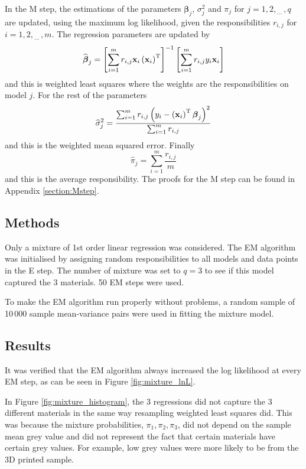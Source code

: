\documentclass[12pt]{report}
\newcommand{\T}{^\textup{T}}
\newcommand{\dotdotdot}{_{\phantom{.}\cdots}}
\newcommand{\vect}[1]{\mathbf{#1}}
\newcommand{\vectGreek}[1]{\boldsymbol{#1}}
\begin{document}
In the M step, the estimations of the  parameters $\vectGreek{\beta}_j$, $\sigma_j^2$ and $\pi_j$ for $j=1,2,\dotdotdot,q$ are updated, using the maximum log likelihood, given the responsibilities $r_{i,j}$ for $i=1,2,\dotdotdot,m$. The regression parameters are updated by
\begin{equation}
\widehat{\vectGreek{\beta}}_j
=
\left[\sum_{i=1}^{m}r_{i,j}
\vect{x}_i\left(\vect{x}_i\right)\T\right]^{-1}
\left[\sum_{i=1}^{m}
r_{i,j}
y_i\vect{x}_i\right]
\end{equation}
and this is weighted least squares where the weights are the responsibilities on model $j$. For the rest of the parameters
\begin{equation}
\widehat{\sigma}_j^2
=
\frac{\sum_{i=1}^{m}
r_{i,j}\left({y_i-\left(\vect{x}_i\right)\T\vectGreek{\beta}_j}\right)^2}
{\sum_{i=1}^{m}r_{i,j}}
\end{equation}
and this is the weighted mean squared error.  Finally
\begin{equation}
\widehat{\pi}_j = \sum_{i=1}^m\frac{r_{i,j}}{m}
\end{equation}
and this is the average responsibility. The proofs for the M step can be found in Appendix \ref{section:Mstep}.

\subsection{Methods}

Only a mixture of 1st order linear regression was considered. The EM algorithm was initialised by assigning random responsibilities to all models and data points in the E step. The number of mixture was set to $q=3$ to see if this model captured the 3 materials. 50 EM steps were used.

To make the EM algorithm run properly without problems, a random sample of 10\,000 sample mean-variance pairs were used in fitting the mixture model.

\subsection{Results}
It was verified that the EM algorithm always increased the log likelihood at every EM step, as can be seen in Figure \ref{fig:mixture_lnL}.

In Figure \ref{fig:mixture_histogram}, the 3 regressions did not capture the 3 different materials in the same way resampling weighted least squares did. This was because the mixture probabilities, $\pi_1,\pi_2,\pi_3$, did not depend on the sample mean grey value and did not represent the fact that certain materials have certain grey values. For example, low grey values were more likely to be from the 3D printed sample.
\end{document}
